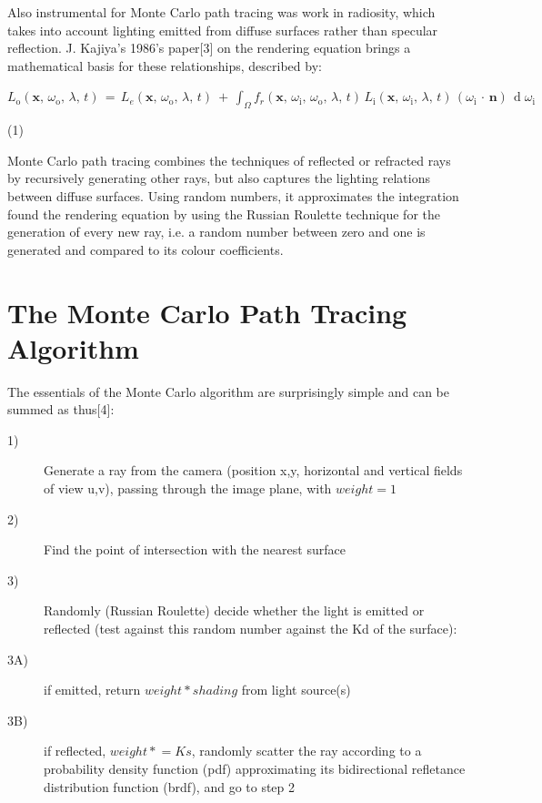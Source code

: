 \documentclass[journal]{IEEEtran}
\begin{document}
\par

Also instrumental for Monte Carlo path tracing was work in radiosity, which takes into account lighting emitted from diffuse surfaces rather than specular reflection. J. Kajiya's 1986's paper[3] on the rendering equation brings a mathematical basis for these relationships, described by:

\begin{center}
$L_{\text{o}}(\mathbf x,\, \omega_{\text{o}},\, \lambda,\, t) \,=\, L_e(\mathbf x,\, \omega_{\text{o}},\, \lambda,\, t) \ +\, \int_\Omega f_r(\mathbf x,\, \omega_{\text{i}},\, \omega_{\text{o}},\, \lambda,\, t)\, L_{\text{i}}(\mathbf x,\, \omega_{\text{i}},\, \lambda,\, t)\, (\omega_{\text{i}}\,\cdot\,\mathbf n)\, \operatorname d \omega_{\text{i}}$
\end{center}

\begin{flushright}
\par 
(1)
\end{flushright}

\par
Monte Carlo path tracing combines the techniques of reflected or refracted rays by recursively generating other rays, but also captures the lighting relations between diffuse surfaces. Using random numbers, it approximates the integration found the rendering equation by using the Russian Roulette technique for the generation of every new ray, i.e. a random number between zero and one is generated and compared to its colour coefficients.

\section{The Monte Carlo Path Tracing Algorithm}
The essentials of the Monte Carlo algorithm are surprisingly simple and can be summed as thus[4]:

\begin{description}
  \item[1)] Generate a ray from the camera (position x,y, horizontal and vertical fields of view u,v), passing through the image plane, with $weight = 1$
  \item[2)] Find the point of intersection with the nearest surface
  \item[3)] Randomly (Russian Roulette) decide whether the light is emitted or reflected (test against this random number against the Kd of the surface):
  \item[3A)] if emitted, return $weight * shading$ from light source(s)
  \item[3B)] if reflected, $weight \mathrel{*}= Ks$, randomly scatter the ray according to a probability density function (pdf) approximating its bidirectional refletance distribution function (brdf), and go to step 2
\end{description}
\end{document}
